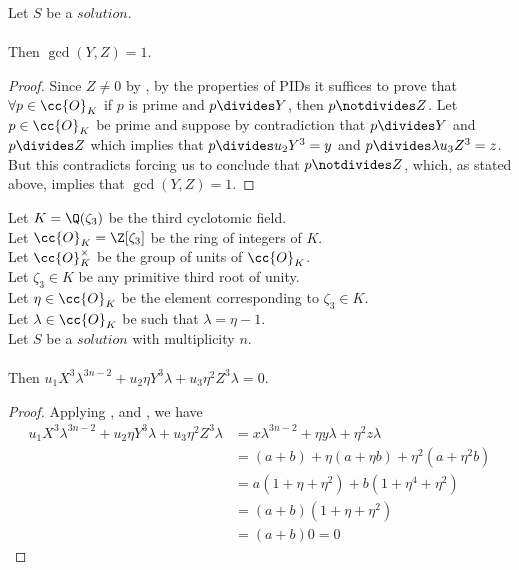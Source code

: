 \begin{lemma}
  \label{lmm:coprime_Y_Z}
  \leanok
  Let $S$ be a $solution$.\\\\
  Then $\gcd(Y, Z) = 1$.
\end{lemma}
\begin{proof}
  \leanok
  Since $Z \neq 0$ by , by the properties of PIDs it suffices to prove that
  $\forall p \in \cc{O}_K$ if $p$ is prime and $p \divides Y$, then $p \notdivides Z$.
  Let $p \in \cc{O}_K$ be prime and suppose by contradiction that $p \divides Y$ and $p \divides Z$
  which implies that $p \divides u_2 Y^3 = y$ and $p \divides \lambda u_3 Z^3 = z$.
  But this contradicts  forcing us to conclude that $p \notdivides Z$, which,
  as stated above, implies that $\gcd(Y,Z)=1$.
\end{proof}

\begin{lemma}
  \label{lmm:formula1}
  \leanok
  Let $K = \Q(\zeta_3)$ be the third cyclotomic field. \\
  Let $\cc{O}_K = \Z[\zeta_3]$ be the ring of integers of $K$. \\
  Let $\cc{O}^\times_K$ be the group of units of $\cc{O}_K$. \\
  Let $\zeta_3 \in K$ be any primitive third root of unity. \\
  Let $\eta \in \cc{O}_K$ be the element corresponding to $\zeta_3 \in K$. \\
  Let $\lambda \in \cc{O}_K$ be such that $\lambda = \eta -1$. \\
  Let $S$ be a $solution$ with multiplicity $n$.\\\\
  Then $u_1 X^3 \lambda^{3n-2}+u_2 \eta Y^3 \lambda +
  u_3 \eta^2 Z^3 \lambda = 0$.
\end{lemma}
\begin{proof}
  \leanok
  Applying ,
   and , we have
  \begin{align*}
      u_1 X^3 \lambda^{3n-2}+u_2 \eta Y^3 \lambda + u_3 \eta^2 Z^3 \lambda
      &= x \lambda^{3n-2} + \eta y \lambda + \eta^2 z \lambda \\
      &= (a+b) + \eta (a+\eta b) + \eta^2 (a+\eta^2 b) \\
      &= a (1 + \eta + \eta^2) + b (1 + \eta^4 + \eta^2) \\
      &= (a+b)(1+\eta+\eta^2)\\
      &= (a+b)0 = 0
  \end{align*}
\end{proof}

